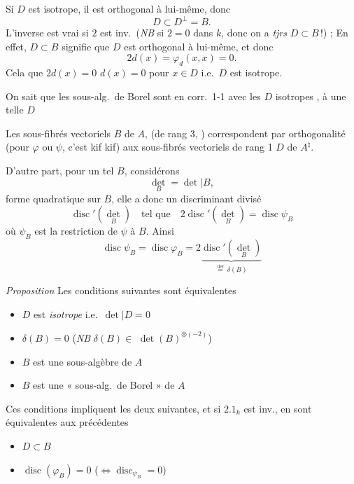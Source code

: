 \documentclass[11pt,a4paper]{article}
\begin{document}
\struck{\ill{}} Si $D$ est isotrope, il est orthogonal à lui-même, donc
\[
D\subset D^{\perp}=B .
\]
L'inverse est vrai si $2$ est inv.\ (\emph{NB} si $2=0$ dans $k$, donc on a \emph{tjrs} $D\subset B$\,!) ; En effet, $D\subset B$ signifie que $D$ est orthogonal à lui-même, et donc
\[
2d(x)=\varphi_{d}(x,x)=0 .
\]
Cela  que $2d(x)=0$  $d(x)=0$ pour $x\in D$ i.e.\ $D$ est isotrope.

On sait que les sous-alg.\ de Borel sont en corr.\ 1-1 avec les $D$ isotropes , à  une telle $D$

Les sous-fibrés vectoriels $B$ de $A$, (de rang 3, ) correspondent par orthogonalité (pour $\varphi$ ou $\psi$, c'est kif kif) aux sous-fibrés vectoriels de rang 1 $D$ de $A^{\natural}$.

D'autre part, pour un tel $B$, considérons
\[
\det_{B}=\det|B ,
\]
forme quadratique sur $B$, elle a donc un discriminant divisé
\[
\operatorname{disc}'(\det_{B}) \quad\text{tel que}\quad 2\operatorname{disc}'(\det_{B})=\operatorname{disc}\psi_{B}
\]
où $\psi_{B}$ est la restriction de $\psi$ à $B$. Ainsi
\[
\operatorname{disc}\psi_{B}=\operatorname{disc}\varphi_{B}=2\underbrace{\operatorname{disc}'(\det_{B})}_{\overset{\mathrm{def}}{=}\ \delta(B)}
\]

\emph{Proposition} Les  conditions suivantes sont équivalentes
\begin{itemize}
\item[(i)] $D$ est \emph{isotrope} i.e.\ $\det|D=0$
\item[(ii)] $\delta(B)=0$ \quad (\emph{NB} $\delta(B)\in$ \struck{\ill{}} $\det(B)^{\otimes(-2)}$)
\item[\struck{\ill{}}(iii)] $B$ est une sous-algèbre de $A$
\item[(iii')] \struck{\ill{}} $B$ est une « sous-alg.\ de Borel » de $A$
\end{itemize}
Ces \struck{\ill{}} conditions impliquent les deux suivantes, et si $2.1_{k}$ est inv.,  en sont équivalentes aux précédentes
\begin{itemize}
\item[(iv)] $D\subset B$
\item[(ii')]  $\operatorname{disc}(\varphi_{B})=0$ \quad ($\Longleftrightarrow \operatorname{disc}_{\psi_{B}}=0$)
\end{itemize}
\end{document}
